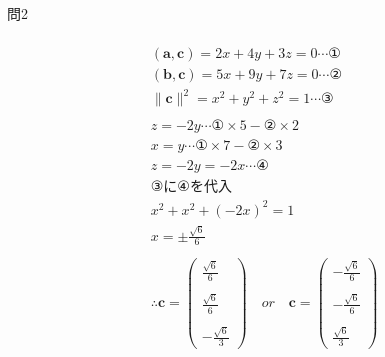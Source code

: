 \documentclass[dvipdfmx,uplatex]{jsarticle}
\begin{document}
  \centerline{\large 問2}
  \begin{equation}
    \begin{aligned}
      \\
      &(\bm{a},\bm{c})=2x + 4y + 3z = 0 \cdots ① \nonumber\\
      &(\bm{b},\bm{c})=5x + 9y + 7z = 0 \cdots ② \nonumber\\
      &\|\bm{c}\|^2=x^2 + y^2 + z^2 = 1 \cdots ③ \nonumber\\
      \\
      &z = -2y \cdots ①\times 5 - ② \times 2\\
      &x = y \cdots ①\times 7 - ② \times 3\\
      &z = -2y = -2x \cdots ④\\
      &③に④を代入\\
      &x^2 + x^2 + (-2x)^2 = 1\\
      &x = \pm \frac{\sqrt{6}}{6}\\
      \\
      &\therefore \bm{c}=\begin{pmatrix} \frac{\sqrt{6}}{6} \\ \\ \frac{\sqrt{6}}{6} \\ \\ -\frac{\sqrt{6}}{3} \end{pmatrix} \quad or \quad \bm{c}=\begin{pmatrix} -\frac{\sqrt{6}}{6} \\ \\ -\frac{\sqrt{6}}{6} \\ \\ \frac{\sqrt{6}}{3} \end{pmatrix}
    \end{aligned}
  \end{equation}
\end{document}
